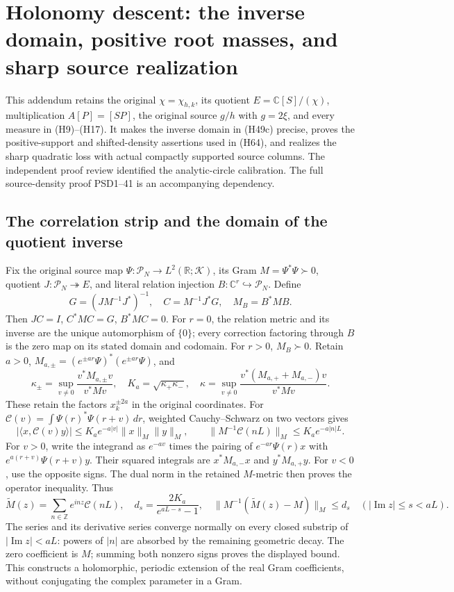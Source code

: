 \section{Holonomy descent: the inverse domain, positive root masses, and sharp source realization}
This addendum retains the original \(\chi=\chi_{h,k}\), its quotient
\(E=\mathbb C[S]/(\chi)\), multiplication \(A[P]=[SP]\), the original
source \(g/h\) with \(g=2\xi\), and every measure in (H9)--(H17).
It makes the inverse domain in (H49c) precise, proves the positive-support
and shifted-density assertions used in (H64), and realizes the sharp
quadratic loss with actual compactly supported source columns.
The independent proof review identified the analytic-circle calibration.
The full source-density proof PSD1--41 is an accompanying dependency.

\subsection{The correlation strip and the domain of the quotient inverse}
Fix the original source map \(\Psi:\mathcal P_N\to L^2(\mathbb R;\mathcal K)\),
its Gram \(M=\Psi^*\Psi\succ0\), quotient \(J:\mathcal P_N\twoheadrightarrow E\),
and literal relation injection \(B:\mathbb C^r\hookrightarrow\mathcal P_N\).
Define
\[
 G=(JM^{-1}J^*)^{-1},\quad C=M^{-1}J^*G,\quad M_B=B^*MB.
 \tag{HDI1}
\]
Then \(JC=I\), \(C^*MC=G\), \(B^*MC=0\). For \(r=0\), the
relation metric and its inverse are the unique automorphism of
\(\{0\}\); every correction factoring through \(B\) is the zero
map on its stated domain and codomain. For \(r>0\), \(M_B\succ0\).
Retain \(a>0\), \(M_{a,\pm}=(e^{\pm ar}\Psi)^*(e^{\pm ar}\Psi)\), and
\[
 \kappa_\pm=\sup_{v\ne0}\frac{v^*M_{a,\pm}v}{v^*Mv},\quad
 K_a=\sqrt{\kappa_+\kappa_-},\quad
 \kappa=\sup_{v\ne0}\frac{v^*(M_{a,+}+M_{a,-})v}{v^*Mv}.
 \tag{HDI2}
\]
These retain the factors \(x_k^{\pm2a}\) in the original coordinates.
For \(\mathcal C(v)=\int\Psi(r)^*\Psi(r+v)\,dr\), weighted
Cauchy--Schwarz on two vectors gives
\[
 |\langle x,\mathcal C(v)y\rangle|
 \le K_a e^{-a|v|}\|x\|_M\|y\|_M,\qquad
 \|M^{-1}\mathcal C(nL)\|_M\le K_a e^{-a|n|L}.
 \tag{HDI3}
\]
For \(v>0\), write the integrand as \(e^{-av}\) times the pairing
of \(e^{-ar}\Psi(r)x\) with \(e^{a(r+v)}\Psi(r+v)y\).
Their squared integrals are \(x^*M_{a,-}x\) and \(y^*M_{a,+}y\).
For \(v<0\), use the opposite signs. The dual norm in the retained
\(M\)-metric then proves the operator inequality.
Thus
\[
 \widetilde M(z)=\sum_{n\in\mathbb Z}e^{inz}\mathcal C(nL),\quad
 d_s=\frac{2K_a}{e^{aL-s}-1},\quad
 \|M^{-1}(\widetilde M(z)-M)\|_M\le d_s
 \quad(|\operatorname{Im}z|\le s<aL).
 \tag{HDI4}
\]
The series and its derivative series converge normally on every
closed substrip of \(|\operatorname{Im}z|<aL\): powers of \(|n|\)
are absorbed by the remaining geometric decay. The zero coefficient
is \(M\); summing both nonzero signs proves the displayed bound.
This constructs a holomorphic, periodic extension of the real Gram
coefficients, without conjugating the complex parameter in a Gram.

